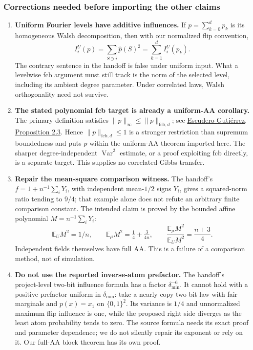 \subsubsection{Corrections needed before importing the other claims}

\begin{enumerate}
\item \textbf{Uniform Fourier levels have additive influences.}
If $p=\sum_{k=0}^d p_k$ is its homogeneous Walsh decomposition, then
with our normalized flip convention,
\[
 I_i^U(p)=\sum_{S\ni i}\widehat p(S)^2
         =\sum_{k=1}^d I_i^U(p_k).
\]
The contrary sentence in the handoff is false under uniform input.
What a levelwise fcb argument must still track is the norm of the
selected level, including its ambient degree parameter. Under
correlated laws, Walsh orthogonality need not survive.

\item \textbf{The stated polynomial fcb target is already a uniform-AA
corollary.} The primary definition satisfies
$\|p\|_\infty\le\|p\|_{\mathrm{fcb},d}$; see
\href{https://arxiv.org/abs/2304.06713v2}{Escudero Guti\'errez,
Proposition 2.3}. Hence $\|p\|_{\mathrm{fcb},d}\le1$ is a stronger
restriction than supremum boundedness and puts $p$ within the
uniform-AA theorem imported here. The sharper degree-independent
$\operatorname{Var}^2$ estimate, or a proof exploiting fcb directly,
is a separate target. This supplies no correlated-Gibbs transfer.

\item \textbf{Repair the mean-square comparison witness.}
The handoff's $f=1+n^{-1}\sum_iY_i$, with independent mean-$1/2$
signs $Y_i$, gives a squared-norm ratio tending to $9/4$; that example
alone does not refute an arbitrary finite comparison constant. The
intended claim is proved by the bounded affine polynomial
$M=n^{-1}\sum_iY_i$:
\[
 \mathbb E_U M^2=1/n,\qquad
 \mathbb E_\mu M^2=\tfrac14+\tfrac{3}{4n},\qquad
 \frac{\mathbb E_\mu M^2}{\mathbb E_U M^2}=\frac{n+3}{4}.
\]
Independent fields themselves have full AA. This is a failure of a
comparison method, not of simulation.

\item \textbf{Do not use the reported inverse-atom prefactor.}
The handoff's project-level two-bit influence formula has a factor
$\delta_{\min}^{-6}$. It cannot hold with a positive prefactor uniform
in $\delta_{\min}$: take a nearly-copy two-bit law with fair marginals
and $p(x)=x_1$ on $\{0,1\}^2$. Its variance is $1/4$ and unnormalized
maximum flip influence is one, while the proposed right side diverges
as the least atom probability tends to zero. The source formula needs
its exact proof and parameter dependence; we do not silently repair
its exponent or rely on it. Our full-AA block theorem has its own proof.


\end{enumerate}
